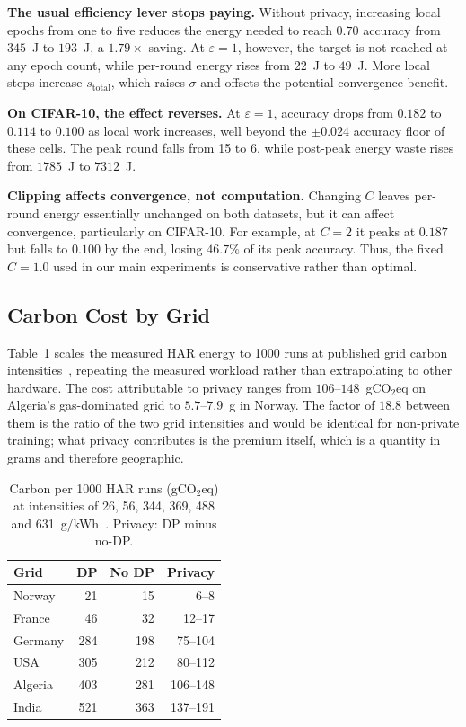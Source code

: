 \textbf{The usual efficiency lever stops paying.} Without privacy, increasing local epochs from one to five reduces the energy needed to reach $0.70$ accuracy from $345$~J to $193$~J, a $1.79\times$ saving. At $\varepsilon=1$, however, the target is not reached at any epoch count, while per-round energy rises from $22$~J to $49$~J. More local steps increase $s_{\text{total}}$, which raises $\sigma$ and offsets the potential convergence benefit.

\textbf{On CIFAR-10, the effect reverses.} At $\varepsilon=1$, accuracy drops from $0.182$ to $0.114$ to $0.100$ as local work increases, well beyond the $\pm 0.024$ accuracy floor of these cells. The peak round falls from 15 to 6, while post-peak energy waste rises from $1785$~J to $7312$~J.

\textbf{Clipping affects convergence, not computation.} Changing $C$ leaves per-round energy essentially unchanged on both datasets, but it can affect convergence, particularly on CIFAR-10. For example, at $C=2$ it peaks at $0.187$ but falls to $0.100$ by the end, losing $46.7\%$ of its peak accuracy. Thus, the fixed $C=1.0$ used in our main experiments is conservative rather than optimal.

\subsection{Carbon Cost by Grid}

Table~\ref{tab:carbon} scales the measured HAR energy to 1000 runs at
published grid carbon intensities~\cite{energy2024yearly}, repeating the
measured workload rather than extrapolating to other hardware. The cost
attributable to privacy ranges from $106$--$148$~gCO$_2$eq on Algeria's gas-dominated grid to
$5.7$--$7.9$~g in Norway. The factor of $18.8$ between them is the ratio of
the two grid intensities and would be identical for non-private training; what
privacy contributes is the premium itself, which is a quantity in grams and
therefore geographic.

\begin{table}[t]
\centering
\caption{Carbon per 1000 HAR runs (gCO$_2$eq) at intensities of 26, 56, 344,
369, 488 and 631~g/kWh~\cite{energy2024yearly}. Privacy: DP minus no-DP.}
\label{tab:carbon}
\footnotesize
\begin{tabular}{lrrr}
\hline
Grid & DP & No DP & Privacy \\
\hline
Norway  &  21 &  15 &     6--8 \\
France  &  46 &  32 &   12--17 \\
Germany & 284 & 198 &  75--104 \\
USA     & 305 & 212 &  80--112 \\
Algeria & 403 & 281 & 106--148 \\
India   & 521 & 363 & 137--191 \\
\hline
\end{tabular}
\end{table}